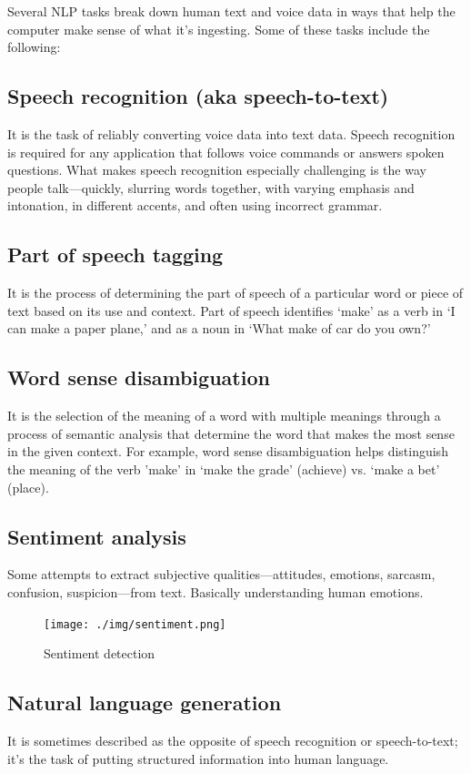 \documentclass[11pt]{article}
\begin{document}
Several NLP tasks break down human text and voice data in ways that help the computer
make sense of what it's ingesting. Some of these tasks include the following:

\subsection{Speech recognition (aka speech-to-text)}
\label{sec:orgaab8843}
It is the task of reliably converting voice data into text data.
Speech recognition is required for any application that follows voice commands or
answers spoken questions. What makes speech recognition especially challenging is
the way people talk—quickly, slurring words together, with varying emphasis and
intonation, in different accents, and often using incorrect grammar.

\subsection{Part of speech tagging}
\label{sec:org4833f63}
It is the process of determining the part of speech of a particular word or
piece of text based on its use and context. Part of speech identifies ‘make’ as a
verb in ‘I can make a paper plane,’ and as a noun in ‘What make of car do you own?’

\subsection{Word sense disambiguation}
\label{sec:orgde4fb7c}
It is the selection of the meaning of a word with multiple meanings through a process
of semantic analysis that determine the word that makes the most sense in the given
context. For example, word sense disambiguation helps distinguish the meaning of the
verb 'make' in ‘make the grade’ (achieve) vs. ‘make a bet’ (place).

\subsection{Sentiment analysis}
\label{sec:org55be584}
Some attempts to extract subjective qualities—attitudes, emotions, sarcasm, confusion,
suspicion—from text. Basically understanding human emotions.
\begin{figure}[htbp]
\centering
\texttt{[image: ./img/sentiment.png]}
\caption{\label{fig:org79524c0}Sentiment detection}
\end{figure}   

\subsection{Natural language generation}
\label{sec:org8815008}
It is sometimes described as the opposite of speech recognition or speech-to-text;
it's the task of putting structured information into human language. 
\end{document}
